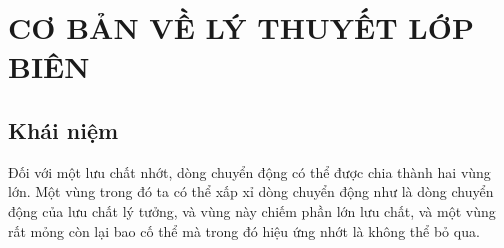 \documentclass[COUCHE_LIMITE.tex]{subfiles}
\begin{document}
\chapter{CƠ BẢN VỀ LÝ THUYẾT LỚP BIÊN}
\section{Khái niệm}

Đối với một lưu chất nhớt, dòng chuyển động có thể được chia thành hai vùng lớn. Một vùng trong đó ta có thể xấp xỉ dòng chuyển động như là dòng chuyển động của lưu chất lý tưởng, và vùng này chiếm phần lớn lưu chất, và một vùng rất mỏng còn lại bao cố thể mà trong đó hiệu ứng nhớt là không thể bỏ qua.
\end{document}
